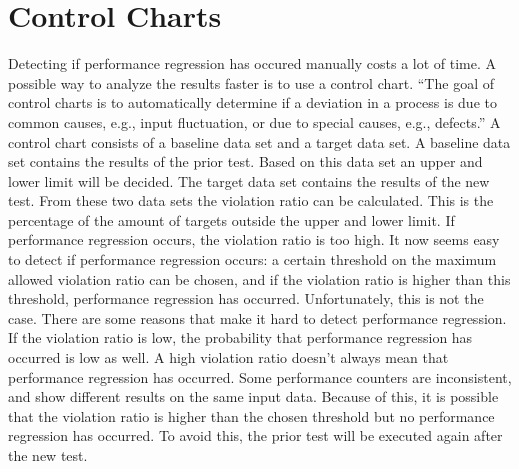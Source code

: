 \section{Control Charts}
Detecting if performance regression has occured manually costs a lot of time. A possible way to analyze the results faster is to use a control chart.
``The goal of control charts is to automatically determine if a deviation in a process is due to common causes, e.g., input fluctuation, or due to special causes, e.g., defects.'' \cite{nguyen2012using} A control chart consists of a baseline data set and a target data set. A baseline data set contains the results of the prior test. Based on this data set an upper and lower limit will be decided. The target data set contains the results of the new test. From these two data sets the violation ratio can be calculated. This is the percentage of the amount of targets outside the upper and lower limit. If performance regression occurs, the violation ratio is too high. It now seems easy to detect if performance regression occurs: a certain threshold on the maximum allowed violation ratio can be chosen, and if the violation ratio is higher than this threshold, performance regression has occurred. Unfortunately, this is not the case. There are some reasons that make it hard to detect performance regression. If the violation ratio is low, the probability that performance regression has occurred is low as well. A high violation ratio doesn't always mean that performance regression has occurred. Some performance counters are inconsistent, and show different results on the same input data. Because of this, it is possible that the violation ratio is higher than the chosen threshold but no performance regression has occurred. To avoid this, the prior test will be executed again after the new test.






